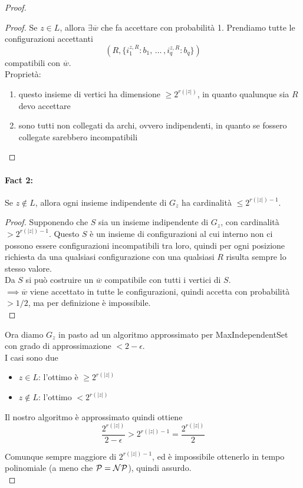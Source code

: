 \begin{proof}
	\begin{proof}
 		Se $z \in L$, allora $\exists \overline w$ che fa accettare con probabilità 1. Prendiamo tutte le configurazioni accettanti
		$$
		(R, \{i_1^{z,R}: b_1, \, \dots \, , i_q^{z,R}: b_q\})
		$$
		compatibili con $\overline w$.\\
		
		Proprietà:
		\begin{enumerate}
			\item questo insieme di vertici ha dimensione $\geq 2^{r(|z|)}$, in quanto qualunque sia $R$ devo accettare
			\item sono tutti non collegati da archi, ovvero indipendenti, in quanto se fossero collegate sarebbero incompatibili
		\end{enumerate}
		\nn
	\end{proof}
	
	\paragraph{Fact 2:} Se $z \notin L$, allora ogni insieme indipendente di $G_z$ ha cardinalità $\leq 2^{r(|z|) - 1}$.\\
	
	\begin{proof}
		Supponendo che $S$ sia un insieme indipendente di $G_z$, con cardinalità $> 2^{r(|z|) - 1}$. Questo $S$ è un insieme di configurazioni al cui interno non ci possono essere configurazioni incompatibili tra loro, quindi per ogni posizione richiesta da una qualsiasi configurazione con una qualsiasi $R$ risulta sempre lo stesso valore.\\
		
		Da $S$ si può costruire un $\overline w$ compatibile con tutti i vertici di $S$.\\
		$\implies \overline w$ viene accettato in tutte le configurazioni, quindi accetta con probabilità $> 1/2$, ma per definizione è impossibile.\\
	\end{proof}
	
	Ora diamo $G_z$ in pasto ad un algoritmo approssimato per MaxIndependentSet con grado di approssimazione $< 2 - \epsilon$.\\
	I casi sono due
	\begin{itemize}
		\item $z \in L$: l'ottimo è $\geq 2^{r(|z|)}$
		\item $z \notin L$: l'ottimo $< 2^{r(|z|)}$
	\end{itemize}
	
	Il nostro algoritmo è approssimato quindi ottiene
	$$ \frac{2^{r(|z|)}}{2 - \epsilon} > 2^{r(|z|) - 1} = \frac{2^{r(|z|)}}{2} $$
	
	Comunque sempre maggiore di $2^{r(|z|)-1}$, ed è impossibile ottenerlo in tempo polinomiale (a meno che $\mathcal{P} = \mathcal{NP}$), quindi assurdo.\\
\end{proof}